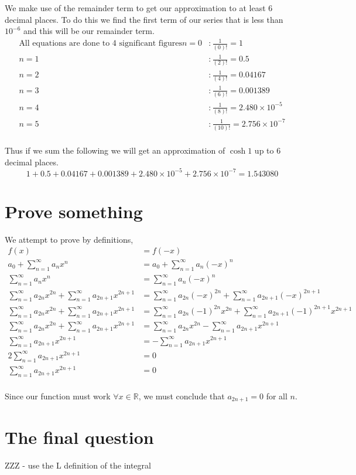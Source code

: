 \documentclass{article}
\begin{document}
We make use of the remainder term to get our approximation to at least
6 decimal places. To do this we find the first term of our series that is
less than $10^{-6}$ and this will be our remainder term.
\begin{align*}
    \text{All equations are done to 4 significant figures}
    n=0 &: \frac{1}{(0)!} = 1 \\
    n=1 &: \frac{1}{(2)!} = 0.5 \\
    n=2 &: \frac{1}{(4)!} = 0.04167 \\
    n=3 &: \frac{1}{(6)!} = 0.001389 \\
    n=4 &: \frac{1}{(8)!} = 2.480 \times 10^{-5} \\
    n=5 &: \frac{1}{(10)!} = 2.756 \times 10^{-7} \\
\end{align*}

Thus if we sum the following we will get an approximation of $\cosh 1$ up to
6 decimal places.
\[
    1 + 0.5 + 0.04167 + 0.001389 + 2.480 \times 10^{-5} + 2.756 \times 10^{-7} = 1.543080
\]

\section{Prove something}
We attempt to prove by definitions,
\begin{align*}
    f(x) &= f(-x) \\
    a_0 + \sum_{n=1}^\infty a_n x^n &= a_0 + \sum_{n=1}^\infty a_n (-x)^n \\
    \sum_{n=1}^\infty a_n x^n &= \sum_{n=1}^\infty a_n (-x)^n \\
    \sum_{n=1}^\infty a_{2n} x^{2n} + \sum_{n=1}^\infty a_{2n+1} x^{2n+1}
    &= \sum_{n=1}^\infty a_{2n} (-x)^{2n} + \sum_{n=1}^\infty a_{2n+1} (-x)^{2n+1} \\
    \sum_{n=1}^\infty a_{2n} x^{2n} + \sum_{n=1}^\infty a_{2n+1} x^{2n+1}
    &= \sum_{n=1}^\infty a_{2n} (-1)^{2n} x^{2n} + \sum_{n=1}^\infty a_{2n+1} (-1)^{2n+1} x^{2n+1} \\
    \sum_{n=1}^\infty a_{2n} x^{2n} + \sum_{n=1}^\infty a_{2n+1} x^{2n+1}
    &= \sum_{n=1}^\infty a_{2n} x^{2n} - \sum_{n=1}^\infty a_{2n+1} x^{2n+1} \\
    \sum_{n=1}^\infty a_{2n+1} x^{2n+1} &= - \sum_{n=1}^\infty a_{2n+1} x^{2n+1} \\
    2 \sum_{n=1}^\infty a_{2n+1} x^{2n+1} &= 0 \\
    \sum_{n=1}^\infty a_{2n+1} x^{2n+1} &= 0 \\
\end{align*}

Since our function must work $\forall x \in \mathbb{R}$, we must conclude that
$a_{2n+1} = 0$ for all $n$.

\section{The final question}

ZZZ - use the L definition of the integral
\end{document}
